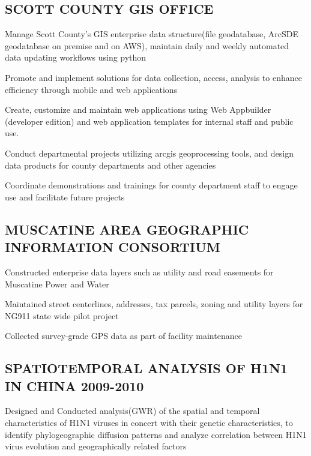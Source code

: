 \documentclass[]{deedy-resume-openfont}
\begin{document}
\begin{minipage}[t]{0.66\textwidth}
\vspace{\topsep}
\subsection{SCOTT COUNTY GIS OFFICE}
\vspace{\topsep} %
\begin{tightemize}
	\item Manage Scott County’s GIS enterprise data structure(file geodatabase, ArcSDE
geodatabase on premise and on AWS), maintain daily and weekly automated data updating workflows using python
	\item Promote and implement solutions for data collection, access, analysis to
enhance efficiency through mobile and web applications
	\item Create, customize and maintain web applications using Web Appbuilder (developer edition) and web application templates for internal staff and public use.
	\item Conduct departmental projects utilizing arcgis geoprocessing tools, and design data products for county departments and other agencies
	\item Coordinate demonstrations and trainings for county department staff to
engage use and facilitate future projects
\end{tightemize}
\sectionsep

\subsection{MUSCATINE AREA GEOGRAPHIC INFORMATION CONSORTIUM}
\begin{tightemize}
	\item Constructed enterprise data layers such as utility and road easements for Muscatine Power and Water
	\item Maintained street centerlines, addresses, tax parcels, zoning and utility layers for NG911 state wide pilot project
	\item Collected survey-grade GPS data as part of facility maintenance
	
\end{tightemize}

\sectionsep

\subsection{SPATIOTEMPORAL ANALYSIS OF H1N1 IN CHINA 2009-2010}
\begin{tightemize}
	\item Designed and Conducted analysis(GWR) of the spatial and temporal
characteristics of H1N1 viruses in concert with their genetic characteristics, to identify phylogeographic diffusion patterns and analyze correlation between
H1N1 virus evolution and geographically related factors
	

\end{tightemize}
\end{minipage}
\end{document}
